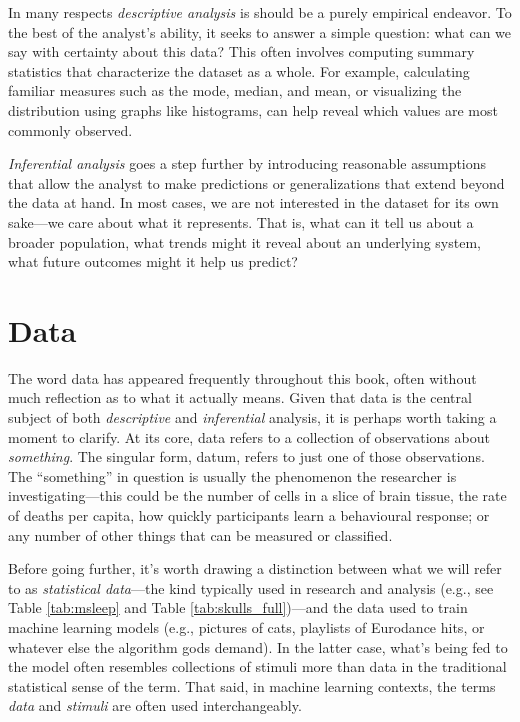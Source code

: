 In many respects \textit{descriptive analysis} is should be a purely empirical endeavor. To the best of the analyst’s ability, it seeks to answer a simple question: what can we say with certainty about this data? This often involves computing summary statistics that characterize the dataset as a whole. For example, calculating familiar measures such as the mode, median, and mean, or visualizing the distribution using graphs like histograms, can help reveal which values are most commonly observed.

\textit{Inferential analysis} goes a step further by introducing reasonable assumptions that allow the analyst to make predictions or generalizations that extend beyond the data at hand. In most cases, we are not interested in the dataset for its own sake—we care about what it represents. That is, what can it tell us about a broader population, what trends might it reveal about an underlying system, what future outcomes might it help us predict?

\section{Data}

The word data has appeared frequently throughout this book, often without much reflection as to what it actually means. Given that data is the central subject of both \textit{descriptive} and \textit{inferential} analysis, it is perhaps worth taking a moment to clarify. At its core, \gls{data} refers to a collection of observations about \textit{something}. The singular form, \gls{datum}, refers to just one of those observations. The ``something'' in question is usually the phenomenon the researcher is investigating—this could be the number of cells in a slice of brain tissue, the rate of deaths per capita, how quickly participants learn a behavioural response; or any number of other things that can be measured or classified. 

Before going further, it’s worth drawing a distinction between what we will refer to as \textit{statistical data}—the kind typically used in research and analysis (e.g., see Table \ref{tab:msleep} and Table \ref{tab:skulls_full})—and the data used to train machine learning models (e.g., pictures of cats, playlists of Eurodance hits, or whatever else the algorithm gods demand). In the latter case, what’s being fed to the model often resembles collections of stimuli more than data in the traditional statistical sense of the term. That said, in machine learning contexts, the terms \textit{data} and \textit{stimuli} are often used interchangeably.

